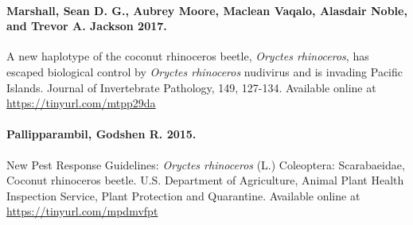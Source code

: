 \documentclass[twocolumn,letterpaper]{scrartcl}
\begin{document}
\paragraph{Marshall, Sean D. G., Aubrey Moore, Maclean Vaqalo, Alasdair Noble, and Trevor A. Jackson 2017.} A new haplotype of the coconut rhinoceros beetle, \textit{Oryctes rhinoceros}, has escaped biological control by \textit{Oryctes rhinoceros} nudivirus and is invading Pacific Islands. Journal of Invertebrate Pathology, 149, 127-134.
Available online at \url{https://tinyurl.com/mtpp29da}

\paragraph{Pallipparambil, Godshen R. 2015.} New Pest Response Guidelines: \textit{Oryctes rhinoceros} (L.) Coleoptera: Scarabaeidae, Coconut rhinoceros beetle. U.S. Department of Agriculture, Animal Plant Health Inspection Service, Plant Protection and Quarantine.
Available online at \url{https://tinyurl.com/mpdmvfpt}

%
%
\end{document}
